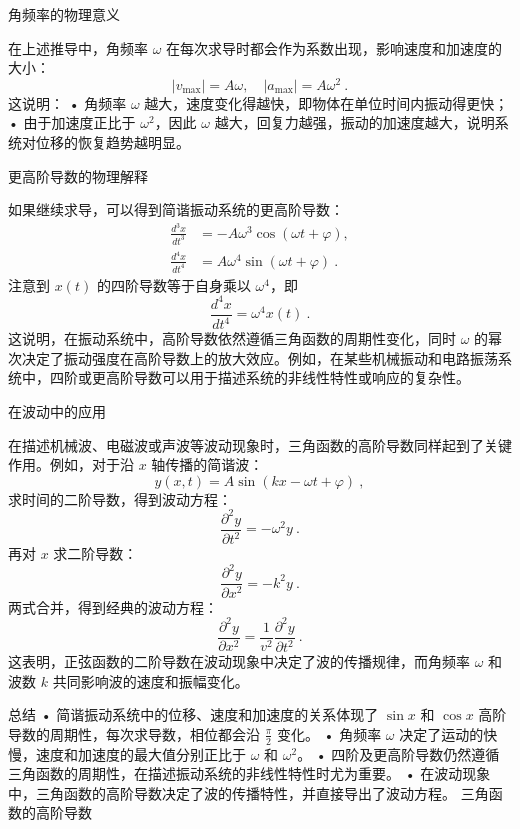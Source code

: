 角频率的物理意义

在上述推导中，角频率 $\omega$ 在每次求导时都会作为系数出现，影响速度和加速度的大小：
\begin{equation}
|v_{\max}| = A\omega, \quad |a_{\max}| = A\omega^2~.
\end{equation}
这说明：
	•	角频率 $\omega$ 越大，速度变化得越快，即物体在单位时间内振动得更快；
	•	由于加速度正比于 $\omega^2$，因此 $\omega$ 越大，回复力越强，振动的加速度越大，说明系统对位移的恢复趋势越明显。

更高阶导数的物理解释

如果继续求导，可以得到简谐振动系统的更高阶导数：
\begin{align*}
\frac{d^3x}{dt^3} &= -A\omega^3 \cos(\omega t + \varphi), \\
\frac{d^4x}{dt^4} &= A\omega^4 \sin(\omega t + \varphi)~.
\end{align*}
注意到 $x(t)$ 的四阶导数等于自身乘以 $\omega^4$，即
\begin{equation}
\frac{d^4x}{dt^4} = \omega^4 x(t)~.
\end{equation}
这说明，在振动系统中，高阶导数依然遵循三角函数的周期性变化，同时 $\omega$ 的幂次决定了振动强度在高阶导数上的放大效应。例如，在某些机械振动和电路振荡系统中，四阶或更高阶导数可以用于描述系统的非线性特性或响应的复杂性。

在波动中的应用

在描述机械波、电磁波或声波等波动现象时，三角函数的高阶导数同样起到了关键作用。例如，对于沿 $x$ 轴传播的简谐波：
\begin{equation}
y(x,t) = A \sin(kx - \omega t + \varphi)~,
\end{equation}
求时间的二阶导数，得到波动方程：
\begin{equation}
\frac{\partial^2 y}{\partial t^2} = -\omega^2 y~.
\end{equation}
再对 $x$ 求二阶导数：
\begin{equation}
\frac{\partial^2 y}{\partial x^2} = -k^2 y~.
\end{equation}
两式合并，得到经典的波动方程：
\begin{equation}
\frac{\partial^2 y}{\partial x^2} = \frac{1}{v^2} \frac{\partial^2 y}{\partial t^2}~.
\end{equation}
这表明，正弦函数的二阶导数在波动现象中决定了波的传播规律，而角频率 $\omega$ 和波数 $k$ 共同影响波的速度和振幅变化。

总结
	•	简谐振动系统中的位移、速度和加速度的关系体现了 $\sin x$ 和 $\cos x$ 高阶导数的周期性，每次求导数，相位都会沿 $\frac{\pi}{2}$ 变化。
	•	角频率 $\omega$ 决定了运动的快慢，速度和加速度的最大值分别正比于 $\omega$ 和 $\omega^2$。
	•	四阶及更高阶导数仍然遵循三角函数的周期性，在描述振动系统的非线性特性时尤为重要。
	•	在波动现象中，三角函数的高阶导数决定了波的传播特性，并直接导出了波动方程。
三角函数的高阶导数

